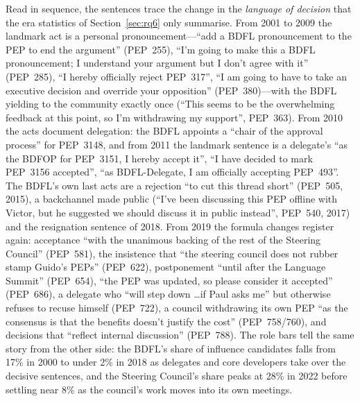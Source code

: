 \documentclass[sigconf,screen]{acmart}
\begin{document}
Read in sequence, the sentences trace the change in the \emph{language of decision} that the era statistics of Section~\ref{sec:rq6} only summarise. From 2001 to 2009 the landmark act is a personal pronouncement---``add a BDFL pronouncement to the PEP to end the argument'' (PEP~255), ``I'm going to make this a BDFL pronouncement; I understand your argument but I don't agree with it'' (PEP~285), ``I hereby officially reject PEP~317'', ``I am going to have to take an executive decision and override your opposition'' (PEP~380)---with the BDFL yielding to the community exactly once (``This seems to be the overwhelming feedback at this point, so I'm withdrawing my support'', PEP~363). From 2010 the acts document delegation: the BDFL appoints a ``chair of the approval process'' for PEP~3148, and from 2011 the landmark sentence is a delegate's ``as the BDFOP for PEP~3151, I hereby accept it'', ``I have decided to mark PEP~3156 accepted'', ``as BDFL-Delegate, I am officially accepting PEP~493''. The BDFL's own last acts are a rejection ``to cut this thread short'' (PEP~505, 2015), a backchannel made public (``I've been discussing this PEP offline with Victor, but he suggested we should discuss it in public instead'', PEP~540, 2017) and the resignation sentence of 2018. From 2019 the formula changes register again: acceptance ``with the unanimous backing of the rest of the Steering Council'' (PEP~581), the insistence that ``the steering council does not rubber stamp Guido's PEPs'' (PEP~622), postponement ``until after the Language Summit'' (PEP~654), ``the PEP was updated, so please consider it accepted'' (PEP~686), a delegate who ``will step down \ldots if Paul asks me'' but otherwise refuses to recuse himself (PEP~722), a council withdrawing its own PEP ``as the consensus is that the benefits doesn't justify the cost'' (PEP~758/760), and decisions that ``reflect internal discussion'' (PEP~788). The role bars tell the same story from the other side: the BDFL's share of influence candidates falls from 17\% in 2000 to under 2\% in 2018 as delegates and core developers take over the decisive sentences, and the Steering Council's share peaks at 28\% in 2022 before settling near 8\% as the council's work moves into its own meetings.
\end{document}
